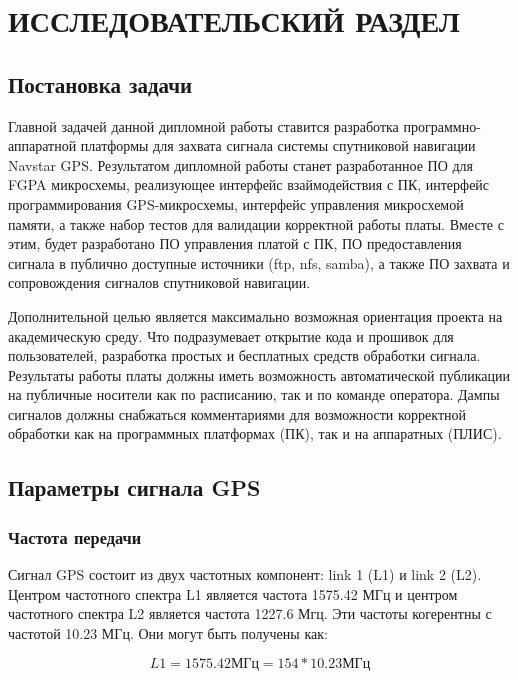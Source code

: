 \section{ИССЛЕДОВАТЕЛЬСКИЙ РАЗДЕЛ}

\subsection{Постановка задачи}
Главной задачей данной дипломной работы ставится разработка программно-аппаратной платформы для захвата сигнала системы спутниковой 
навигации Navstar GPS. Результатом дипломной работы станет разработанное ПО для FGPA микросхемы, реализующее интерфейс взаймодействия с ПК,
интерфейс программирования GPS-микросхемы, интерфейс управления микросхемой памяти, а также набор тестов для валидации корректной работы
платы. Вместе с этим, будет разработано ПО управления платой с ПК, ПО предоставления сигнала в публично доступные источники
(ftp, nfs, samba), а также ПО захвата и сопровождения сигналов спутниковой навигации. 

Дополнительной целью является максимально возможная ориентация проекта на академическую среду. Что подразумевает открытие кода и прошивок
для пользователей, разработка простых и бесплатных средств обработки сигнала. Результаты работы платы должны иметь возможность
автоматической публикации на публичные носители как по расписанию, так и по команде оператора. Дампы сигналов должны снабжаться
комментариями для возможности корректной обработки как на программных платформах (ПК), так и на аппаратных (ПЛИС).

\subsection{Параметры сигнала GPS}
\label{razdel11}
\subsubsection*{Частота передачи}
Сигнал GPS состоит из двух частотных компонент: link 1 (L1) и link 2 (L2). Центром частотного спектра L1 является
частота 1575.42 МГц и центром частотного спектра L2 является частота 1227.6 Мгц. Эти частоты когерентны с
частотой 10.23 МГц. Они могут быть получены как:

\begin{equation}
L1=1575.42\mbox{МГц}=154*10.23\mbox{МГц}
\label{eq:l1_freq}
\end{equation}

